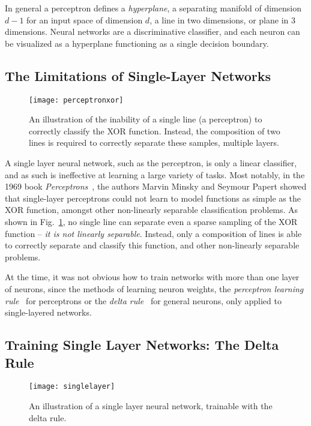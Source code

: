 \documentclass[thesis]{subfiles}
\begin{document}
In general a perceptron defines a \emph{hyperplane}, a separating manifold of dimension $d - 1$ for an input space of dimension $d$, a line in two dimensions, or plane in 3 dimensions. Neural networks are a discriminative classifier, and each neuron can be visualized as a hyperplane functioning as a single decision boundary.

\subsection{The Limitations of Single-Layer Networks}
\begin{figure}[tbp]
\centering
\texttt{[image: perceptronxor]}
\caption[An illustration of the inability of a single line to correctly classify the XOR function]{An illustration of the inability of a single line (\ie a perceptron) to correctly classify the XOR function. Instead, the composition of two lines is required to correctly separate these samples, \ie multiple layers.}
\label{fig:perceptronxor}
\end{figure}
A single layer neural network, such as the perceptron, is only a linear classifier, and as such is ineffective at learning a large variety of tasks. Most notably, in the 1969 book \emph{Perceptrons}~\citep{minsky1988perceptrons}, the authors Marvin Minsky and Seymour Papert showed that single-layer perceptrons could not learn to model functions as simple as the XOR function, amongst other non-linearly separable classification problems. As shown in Fig.~\ref{fig:perceptronxor}, no single line can separate even a sparse sampling of the XOR function -- \ie \emph{it is not linearly separable}. Instead, only a composition of lines is able to correctly separate and classify this function, and other non-linearly separable problems.

At the time, it was not obvious how to train networks with more than one layer of neurons, since the methods of learning neuron weights, the \emph{perceptron learning rule}~\citep{rosenblatt1961principles} for perceptrons or the \emph{delta rule}~\citep{widrow1960adaptive} for general neurons, only applied to single-layered networks. %

\subsection{Training Single Layer Networks: The Delta Rule}
\label{deltarule}
\begin{figure}[tbp]
\centering
\texttt{[image: singlelayer]}
\caption[A single layer neural network]{An illustration of a single layer neural network, trainable with the delta rule.}
\label{fig:singlelayer}
\end{figure}
\end{document}
